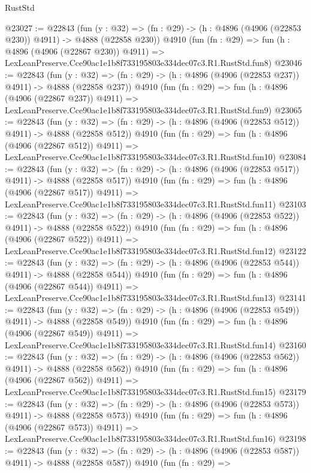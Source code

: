 \begin{lexlean}{RustStd}
\begin{coremodule}
@23027 := @22843
    (fun (y : @32) => (fn : @29) -> (h : @4896 (@4906 (@22853 @230)) @4911) -> @4888 (@22858 @230))
    @4910
    (fun (fn : @29) =>
    fun (h : @4896 (@4906 (@22867 @230)) @4911) =>
    LexLeanPreserve.Cce90ac1e1b8f733195803e334dec07c3.R1.RustStd.fun8)
@23046 := @22843
    (fun (y : @32) => (fn : @29) -> (h : @4896 (@4906 (@22853 @237)) @4911) -> @4888 (@22858 @237))
    @4910
    (fun (fn : @29) =>
    fun (h : @4896 (@4906 (@22867 @237)) @4911) =>
    LexLeanPreserve.Cce90ac1e1b8f733195803e334dec07c3.R1.RustStd.fun9)
@23065 := @22843
    (fun (y : @32) => (fn : @29) -> (h : @4896 (@4906 (@22853 @512)) @4911) -> @4888 (@22858 @512))
    @4910
    (fun (fn : @29) =>
    fun (h : @4896 (@4906 (@22867 @512)) @4911) =>
    LexLeanPreserve.Cce90ac1e1b8f733195803e334dec07c3.R1.RustStd.fun10)
@23084 := @22843
    (fun (y : @32) => (fn : @29) -> (h : @4896 (@4906 (@22853 @517)) @4911) -> @4888 (@22858 @517))
    @4910
    (fun (fn : @29) =>
    fun (h : @4896 (@4906 (@22867 @517)) @4911) =>
    LexLeanPreserve.Cce90ac1e1b8f733195803e334dec07c3.R1.RustStd.fun11)
@23103 := @22843
    (fun (y : @32) => (fn : @29) -> (h : @4896 (@4906 (@22853 @522)) @4911) -> @4888 (@22858 @522))
    @4910
    (fun (fn : @29) =>
    fun (h : @4896 (@4906 (@22867 @522)) @4911) =>
    LexLeanPreserve.Cce90ac1e1b8f733195803e334dec07c3.R1.RustStd.fun12)
@23122 := @22843
    (fun (y : @32) => (fn : @29) -> (h : @4896 (@4906 (@22853 @544)) @4911) -> @4888 (@22858 @544))
    @4910
    (fun (fn : @29) =>
    fun (h : @4896 (@4906 (@22867 @544)) @4911) =>
    LexLeanPreserve.Cce90ac1e1b8f733195803e334dec07c3.R1.RustStd.fun13)
@23141 := @22843
    (fun (y : @32) => (fn : @29) -> (h : @4896 (@4906 (@22853 @549)) @4911) -> @4888 (@22858 @549))
    @4910
    (fun (fn : @29) =>
    fun (h : @4896 (@4906 (@22867 @549)) @4911) =>
    LexLeanPreserve.Cce90ac1e1b8f733195803e334dec07c3.R1.RustStd.fun14)
@23160 := @22843
    (fun (y : @32) => (fn : @29) -> (h : @4896 (@4906 (@22853 @562)) @4911) -> @4888 (@22858 @562))
    @4910
    (fun (fn : @29) =>
    fun (h : @4896 (@4906 (@22867 @562)) @4911) =>
    LexLeanPreserve.Cce90ac1e1b8f733195803e334dec07c3.R1.RustStd.fun15)
@23179 := @22843
    (fun (y : @32) => (fn : @29) -> (h : @4896 (@4906 (@22853 @573)) @4911) -> @4888 (@22858 @573))
    @4910
    (fun (fn : @29) =>
    fun (h : @4896 (@4906 (@22867 @573)) @4911) =>
    LexLeanPreserve.Cce90ac1e1b8f733195803e334dec07c3.R1.RustStd.fun16)
@23198 := @22843
    (fun (y : @32) => (fn : @29) -> (h : @4896 (@4906 (@22853 @587)) @4911) -> @4888 (@22858 @587))
    @4910
    (fun (fn : @29) =>

\end{coremodule}
\end{lexlean}
